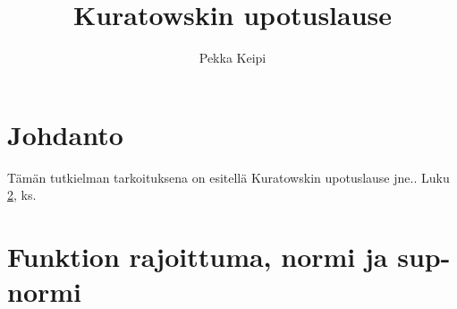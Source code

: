 \documentclass[12pt,a4paper,leqno]{report}
\title{Kuratowskin upotuslause}
\author{Pekka Keipi}
\theoremstyle{plain}
\theoremstyle{definition}
\theoremstyle{remark}
\begin{document}
\maketitle

\tableofcontents

\chapter{Johdanto}\label{johd}

Tämän tutkielman tarkoituksena on esitellä Kuratowskin upotuslause jne.. Luku \ref{normi}, ks.\ \cite{Topo1}

\chapter{Funktion rajoittuma, normi ja sup-normi}\label{normi}
\end{document}
